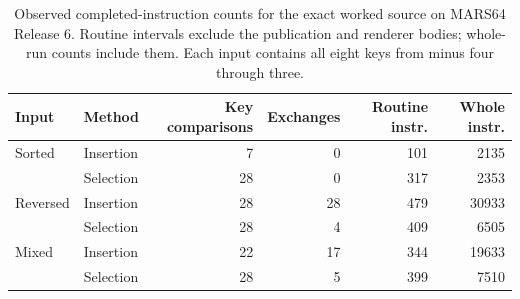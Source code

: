 \begin{table}[htbp]
  \centering
  \small
  \begin{tabular}{llrrrr}
    \toprule
    Input    & Method    & Key comparisons & Exchanges & Routine instr. & Whole instr. \\
    \midrule
    Sorted   & Insertion & 7               & 0         & 101            & 2135         \\
             & Selection & 28              & 0         & 317            & 2353         \\
    Reversed & Insertion & 28              & 28        & 479            & 30933        \\
             & Selection & 28              & 4         & 409            & 6505         \\
    Mixed    & Insertion & 22              & 17        & 344            & 19633        \\
             & Selection & 28              & 5         & 399            & 7510         \\
    \bottomrule
  \end{tabular}
  \caption{Observed completed-instruction counts for the exact worked source on MARS64 Release 6. Routine intervals exclude the publication and renderer bodies; whole-run counts include them. Each input contains all eight keys from minus four through three.}
  \label{tab:revision-sorting-costs}
\end{table}
